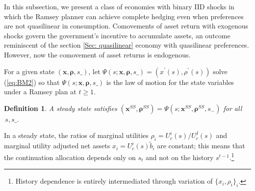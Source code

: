 \documentclass[thmsb,11pt]{article}
\newtheorem{definition}{Definition}
\begin{document}
In this  subsection, we  present  a class of  economies with binary IID shocks  in which  the Ramsey planner can achieve complete hedging even when preferences are not quasilinear in consumption. %
 Comovements of   asset return with exogenous shocks govern the government's incentive to accumulate assets, an outcome reminiscent of the section \ref{Sec: quasilinear}  economy with quasilinear preferences.
However, now the comovement of asset returns is endogenous.

For a given state $\left(
\bm{x},\bm{\rho },s\_\right) $, let  $\Psi \left( s;\bm{x},%
\bm{\rho },s\_\right) =\left( x^{\prime }\left( s\right) ,\rho ^{\prime
}\left( s\right) \right) $  solve (\ref{eq:BM2}) so that $\Psi \left( s;\bm{x},\bm{\rho },s\_\right) $ is the law of motion for the state variables
under a Ramsey plan at $t \geq 1$.
\begin{definition} \label{defn: steady state}
 A steady state %
 satisfies $\left(\bm{ x}^{SS},\bm{\rho}
^{SS}\right) =\Psi \left( s;\bm{x}^{SS},\bm{\rho} ^{SS},s_{-}\right) $ for all $%
\,s,s\_.$
\end{definition}
In a steady state, the ratios  of marginal utilities  $\rho_i =U_{c}^{i}(s)/U_{c}^{I}(s)$ and marginal utility adjusted net assets $x_i=U^i_c(s)\tilde{b}_i$ are constant;
this means that the continuation allocation depends only on  $s_{t}$ and not on the  history $s^{t-1}$.\footnote{History dependence
is entirely intermediated through variation of $\{x_i,\rho_i\}_i$.}
\end{document}
